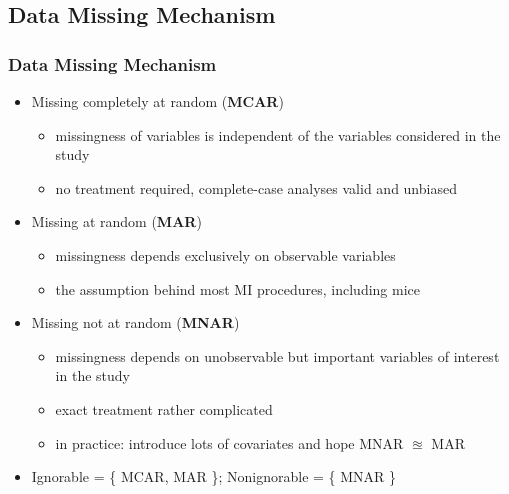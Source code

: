 \documentclass[UKenglish
  pdftex                    %
  dvipsnames                %
]{beamer}
\newcommand{\tmark}{\textcolor{blue}{\ding{51}}}
\newcommand{\pk}[1]{\textcolor{Rblue}{\textsf{#1}}}
\begin{document}
\subsection{Data Missing Mechanism}
\begin{frame}\frametitle{Data Missing Mechanism \normalsize\parencite{rubin:1976}}

\begin{itemize}
  \item Missing completely at random (\textbf{MCAR})
    \begin{itemize}
      \item[\ding{46}] missingness of variables is independent of the variables considered in the study
      \item[\tmark] no treatment required, complete-case analyses valid and unbiased
    \end{itemize}

    \item Missing at random (\textbf{MAR})
  \begin{itemize}
    \item[\ding{46}] missingness depends exclusively on observable variables
    \item[\tmark] the assumption behind most MI procedures, including \pk{mice}
  \end{itemize}

  \item Missing not at random (\textbf{MNAR})
  \begin{itemize}
    \item[\ding{46}] missingness depends on unobservable but important variables of interest in the study
    \item[\tmark] exact treatment rather complicated \parencite{rose:2013}
    \item[\tmark] in practice: introduce lots of covariates and hope MNAR $\approxeq$ MAR
  \end{itemize}

  \item[\ding{108}] Ignorable = \{ MCAR, MAR \}; Nonignorable = \{ MNAR \}
\end{itemize}

\end{frame}
\end{document}
